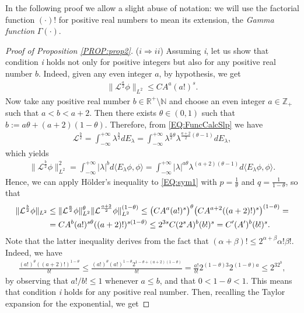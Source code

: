 \documentclass[12pt,oneside,a4paper]{book}
\numberwithin{equation}{section}     %
\theoremstyle{plain}
\theoremstyle{definition}
\newcommand{\Z}{{\mathbb Z}}
\newcommand{\N}{{\mathbb N}}
\newcommand{\R}{{\mathbb R}}
\newcommand{\slp}{{\mathcal L}}
\begin{document}
In the following proof we allow a slight abuse of notation: we will use the {factorial function} $(\cdot)!$ for positive real numbers to mean its extension, the \textit{Gamma function} $\Gamma(\cdot)$.

\begin{proof}[Proof of Proposition \ref{PROP:prop2}]
	($i \Rightarrow ii$)
	Assuming \textit{i}, let us show that condition \textit{i} holds not only for positive integers but also for any positive real number $b$. Indeed, given any even integer $a$, by hypothesis, we get
	\begin{align*}
	\|\slp^{\frac{a}{2}}\phi\|_{L^2}\leq CA^a(a!)^s.
	\end{align*}
	Now take any positive real number $b\in\R^+\setminus\N$ and choose  an even integer $a\in\Z_+$ such that $a<b<a+2$. Then there exists $\theta\in (0,1)$ such that $b:=a\theta+(a+2)(1-\theta)$. Therefore, from \eqref{EQ:FuncCalcSlp} we have
	\begin{align*}
	\slp^{\frac{b}{2}}=\int_{-\infty}^{+\infty}\lambda^{\frac{b}{2}}dE_{\lambda}=\int_{-\infty}^{+\infty}\lambda^{\frac{a}{2}\theta}\lambda^{\frac{a+2}{2}(\theta-1)}dE_{\lambda},
	\end{align*}
	which yields
	\begin{align}\label{EQ:sym1}
	\|\slp^{\frac{b}{2}}\phi\|^2_{L^2}=\int_{-\infty}^{+\infty}|\lambda|^{b}d\langle E_{\lambda}\phi,\phi\rangle
	=\int_{-\infty}^{+\infty}|\lambda|^{a\theta}\lambda^{(a+2)(\theta-1)}d\langle E_{\lambda}\phi,\phi\rangle.
	\end{align}
	Hence, we can apply H\"older's inequality to \eqref{EQ:sym1} with $p=\frac{1}{\theta}$ and $q=\frac{1}{1-\theta}$, so that 
	\begin{align}\notag
	\|\slp^{\frac{b}{2}}\phi\|_{L^2}&\leq\|\slp^{\frac{a}{2}}\phi\|^\theta_{L^2}\|\slp^{\frac{a+2}{2}}\phi\|^{(1-\theta)}_{L^2}\leq\big (CA^a(a!)^s\big )^\theta\big (CA^{a+2}((a+2)!)^s\big )^{(1-\theta)}=\\\notag
	&=CA^b(a!)^{s\theta}((a+2)!)^{s(1-\theta)}\leq 2^{3s}C(2^sA)^b(b!)^s=C'(A')^b(b!)^s.
	\end{align}
	Note that the latter inequality derives from the fact that $(\alpha+\beta)!\leq2^{\alpha+\beta}\alpha!\beta!$. Indeed, we have
	\begin{align*}
	\frac{(a!)^\theta((a+2)!)^{1-\theta}}{b!}\leq\frac{(a!)^\theta(a!)^{1-\theta}2^{1-\theta+(a+2)(1-\theta)}}{b!}=\frac{a!}{b!}2^{(1-\theta)3}2^{(1-\theta)a}\leq 2^32^b,
	\end{align*} 
	by observing that $a!/b!\leq 1$ whenever $a\leq b$, and that $0<1-\theta<1$. This means that condition \textit{i} holds for any positive real number. Then, recalling the Taylor expansion for the exponential, we get

\end{proof}
\end{document}
